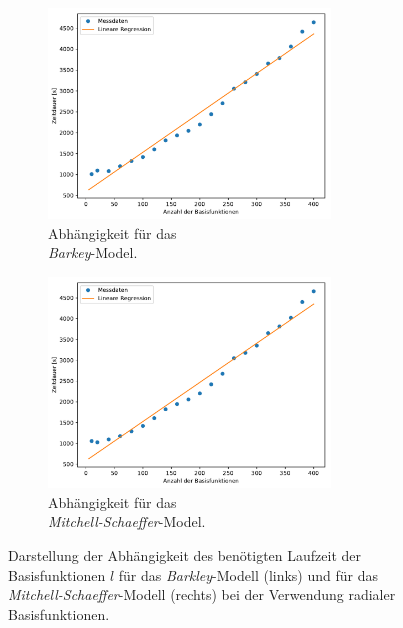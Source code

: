 \begin{figure}[h]
	\centering
	\begin{subfigure}{.5\textwidth}
		\centering
		\includegraphics[height=2.2in]{figures/results/cross_prediction/rbf_placements_uv_time.pdf}
		\setcapmargin[1cm]{1cm}
		\caption{Abhängigkeit für das \\ \textit{Barkey}-Model.}
		\label{fig:exp_cross_rbf_placements_time_uv}
	\end{subfigure}%
	\begin{subfigure}{.5\textwidth}
		\centering
		\includegraphics[height=2.2in]{figures/results/cross_prediction/rbf_placements_vh_time.pdf}
		\setcapmargin[1cm]{1cm}
		\caption{Abhängigkeit für das \\ \textit{Mitchell-Schaeffer}-Model.}
		\label{fig:exp_cross_rbf_placements_time_vh}
	\end{subfigure}
	\caption{Darstellung der Abhängigkeit des benötigten Laufzeit der Basisfunktionen $l$ für das \textit{Barkley}-Modell (links) und für das \textit{Mitchell-Schaeffer}-Modell (rechts) bei der Verwendung radialer Basisfunktionen.}
	\label{fig:exp_cross_rbf_placements_time}
\end{figure}

